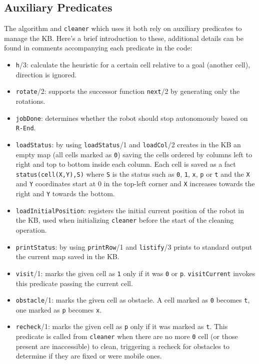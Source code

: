 \subsection{Auxiliary Predicates}
The algorithm and \texttt{cleaner} which uses it both rely on auxiliary predicates to manage the KB. Here's a brief introduction to these, additional details can be found in comments accompanying each predicate in the code:
\begin{itemize}
	\item \texttt{h}/3: calculate the heuristic for a certain cell relative to a goal (another cell), direction is ignored.
	\item \texttt{rotate}/2: supports the successor function \texttt{next}/2 by generating only the rotations.
	\item \texttt{jobDone}: determines whether the robot should stop autonomously based on \texttt{R-End}.
	\item \texttt{loadStatus}: by using \texttt{loadStatus}/1 and \texttt{loadCol}/2 creates in the KB an empty map (all cells marked as \texttt{0}) saving the cells ordered by columns left to right and top to bottom inside each column. Each cell is saved as a fact \texttt{status(cell(X,Y),S)} where \texttt{S} is the status such as \texttt{0}, \texttt{1}, \texttt{x}, \texttt{p} or \texttt{t} and the \texttt{X} and \texttt{Y} coordinates start at 0 in the top-left corner and \texttt{X} increases towards the right and \texttt{Y} towards the bottom.
	\item \texttt{loadInitialPosition}: registers the initial current position of the robot in the KB, used when initializing \texttt{cleaner} before the start of the cleaning operation.
	\item \texttt{printStatus}: by using \texttt{printRow}/1 and \texttt{listify}/3 prints to standard output the current map saved in the KB.
	\item \texttt{visit}/1: marks the given cell as \texttt{1} only if it was \texttt{0} or \texttt{p}. \texttt{visitCurrent} invokes this predicate passing the current cell.
	\item \texttt{obstacle}/1: marks the given cell as obstacle. A cell marked as \texttt{0} becomes \texttt{t}, one marked as \texttt{p} becomes \texttt{x}.
	\item \texttt{recheck}/1: marks the given cell as \texttt{p} only if it was marked as \texttt{t}. This predicate is called from \texttt{cleaner} when there are no more \texttt{0} cell (or those present are inaccessible) to clean, triggering a recheck for obstacles to determine if they are fixed or were mobile ones.

\end{itemize}
